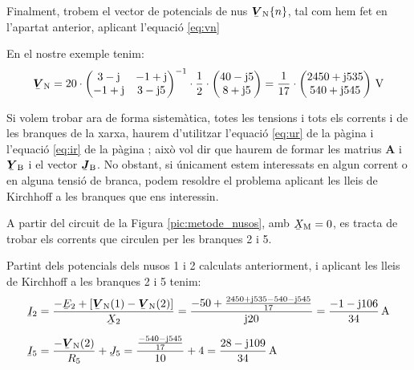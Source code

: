 Finalment,
trobem el vector de potencials de nus $\mcmplx{V}\ped{N}\{n\}$, tal
com  hem fet en l'apartat anterior, aplicant l'equaci\'{o} \eqref{eq:vn}

En el nostre exemple tenim:
\[
   \mcmplx{V}\ped{N} =
   20 \cdot \begin{pmatrix}
         3 - \ju  & -1 + \ju \\ -1 + \ju & 3 - \ju 5
   \end{pmatrix} ^{-1} \cdot
   \frac{1}{2} \cdot \begin{pmatrix}
         40 - \ju 5 \\
         8 + \ju 5
   \end{pmatrix} =
   \frac{1}{17} \cdot \begin{pmatrix}
         2450 + \ju 535 \\ 540  + \ju 545
   \end{pmatrix}\unit{V}
\]

Si volem trobar ara de forma sistem\`{a}tica, totes les tensions i tots
els corrents i  de les branques de la xarxa, haurem d'utilitzar
l'equaci\'{o} \eqref{eq:ur} de la p\`{a}gina \pageref{eq:ur} i l'equaci\'{o}
\eqref{eq:ir} de la p\`{a}gina \pageref{eq:ir}; aix\`{o} vol dir que haurem
de formar les matrius $\boldsymbol{A}$ i $\mcmplx{Y}\ped{B}$ i el
vector $\mcmplx{J}\ped{B}$. No obstant, si \'{u}nicament estem
interessats en algun corrent o en alguna tensi\'{o} de branca, podem
resoldre el problema aplicant les lleis de Kirchhoff a les branques
que ens interessin.


\begin{exemple}
A partir del circuit de la Figura \vref{pic:metode_nusos}, amb
$\cmplx{X}\ped{M}=0$, es tracta de trobar els corrents que circulen
per les branques 2 i 5.

Partint dels potencials dels nusos 1 i 2 calculats anteriorment, i
aplicant les lleis de Kirchhoff a les branques 2 i 5 tenim:
\begin{align*}
   \cmplx{I}_2 &= \frac{-\cmplx{E}_2 + [\mcmplx{V}\ped{N}(1) - \mcmplx{V}\ped{N}(2)]}
                  {\cmplx{X}_2} = \frac{-50 + \frac{2450+\ju 535 -540
                  - \ju 545}{17}} {\ju 20} = \frac{-1 - \ju 106}{34}\unit{A} \\[1.5ex]
   \cmplx{I}_5 &=  \frac{- \mcmplx{V}\ped{N}(2)}{R_5}  + \cmplx{J}_5 =
                  \frac{\frac{-540 - \ju 545}{17}}{10} + 4 =
                  \frac{28 - \ju 109}{34}\unit{A}
\end{align*}

\end{exemple}

